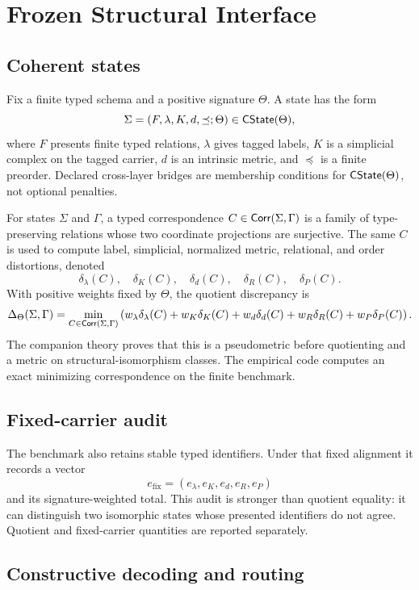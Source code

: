 \section{Frozen Structural Interface}
\label{sec:interface}

\subsection{Coherent states}

Fix a finite typed schema and a positive signature \(\Theta\).  A state has the
form
\[
\Sigma=(F,\lambda,K,d,\preceq;\Theta)\in\mathsf{CState}(\Theta),
\]
where \(F\) presents finite typed relations, \(\lambda\) gives tagged labels,
\(K\) is a simplicial complex on the tagged carrier, \(d\) is an intrinsic
metric, and \(\preceq\) is a finite preorder.  Declared cross-layer bridges are
membership conditions for \(\mathsf{CState}(\Theta)\), not optional penalties.

For states \(\Sigma\) and \(\Gamma\), a typed correspondence
\(C\in\mathsf{Corr}(\Sigma,\Gamma)\) is a family of type-preserving relations whose two
coordinate projections are surjective.  The same \(C\) is used to compute
label, simplicial, normalized metric, relational, and order distortions,
denoted
\[
\delta_\lambda(C),\quad \delta_K(C),\quad \delta_d(C),\quad
\delta_R(C),\quad \delta_P(C).
\]
With positive weights fixed by \(\Theta\), the quotient discrepancy is
\[
\Delta_{\Theta}(\Sigma,\Gamma)
=
\min_{C\in\mathsf{Corr}(\Sigma,\Gamma)}
\left(
w_\lambda\delta_\lambda(C)
+w_K\delta_K(C)
+w_d\delta_d(C)
+w_R\delta_R(C)
+w_P\delta_P(C)
\right).
\]
The companion theory proves that this is a pseudometric before quotienting
and a metric on structural-isomorphism classes.  The empirical code computes
an exact minimizing correspondence on the finite benchmark.

\subsection{Fixed-carrier audit}

The benchmark also retains stable typed identifiers.  Under that fixed
alignment it records a vector
\[
e_{\mathrm{fix}}
=
(e_\lambda,e_K,e_d,e_R,e_P)
\]
and its signature-weighted total.  This audit is stronger than quotient
equality: it can distinguish two isomorphic states whose presented identifiers
do not agree.  Quotient and fixed-carrier quantities are reported separately.

\subsection{Constructive decoding and routing}


